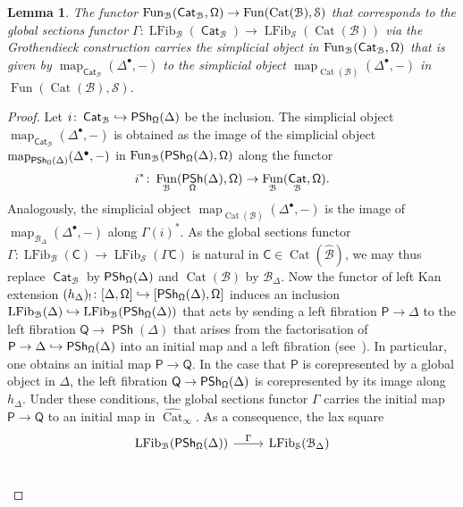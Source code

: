 \documentclass[reqno]{amsart}
\numberwithin{equation}{subsection}
\theoremstyle{plain}
\newtheorem{lemma}[equation]{Lemma}
\theoremstyle{definition}
\let\scr=\mathcal
\let\into=\hookrightarrow
\def\BB{\scr B}
\def\SS{\scr S}
\def\BBB{\widehat{\BB}}
\DeclareMathOperator{\IPSh}{\mathsf{PSh}}
\DeclareMathOperator{\Cat}{Cat}
\DeclareMathOperator{\ICat}{\mathsf{Cat}}
\DeclareMathOperator{\LFib}{LFib}
\DeclareMathOperator{\Fun}{Fun}
\DeclareMathOperator{\Map}{map}
\newcommand{\map}[1]{\Map_{#1}}
\newcommand{\I}[1]{\mathsf{#1}}
\newcommand{\iFun}[2]{{[#1,#2]}}
\newcommand{\Simp}[1]{#1_{\Delta}}
\newcommand{\CatSS}{\widehat{\Cat}_\infty}
\begin{document}
\begin{lemma}
	\label{lem:globalSectionsUniversalCosimplicialObject}
	The functor $\Fun_{\BB}(\ICat_{\BB},\Univ)\to\Fun(\Cat(\BB),\SS)$ that corresponds to the global sections functor $\Gamma\colon \LFib_{\BB}(\ICat_{\BB})\to\LFib_{\SS}(\Cat(\BB))$ via the Grothendieck construction carries the simplicial object in $\Fun_{\BB}(\ICat_{\BB},\Univ)$ that is given by $\map{\ICat_{\BB}}(\Delta^\bullet,-)$ to the simplicial object $\map{\Cat(\BB)}(\Delta^\bullet,-)$ in $\Fun(\Cat(\BB),\SS)$.
\end{lemma}
\begin{proof}
	Let $i\colon \ICat_{\BB}\into\IPSh_{\Univ}(\Delta)$ be the inclusion. The simplicial object $\map{\ICat_{\BB}}(\Delta^\bullet,-)$ is obtained as the image of the simplicial object $\map{\IPSh_{\Univ}(\Delta)}(\Delta^\bullet,-)$ in $\Fun_{\BB}(\IPSh_{\Univ}(\Delta),\Univ)$ along the functor
	\begin{equation*}
	i^\ast\colon \Fun_{\BB}(\IPSh_{\Univ}(\Delta),\Univ)\to\Fun_{\BB}(\ICat_{\BB},\Univ).
	\end{equation*}
	Analogously, the simplicial object $\map{\Cat(\BB)}(\Delta^\bullet,-)$ is the image of $\map{\Simp\BB}(\Delta^\bullet,-)$ along $\Gamma(i)^\ast$.
	As the global sections functor $\Gamma\colon \LFib_{\BB}(\I{C})\to\LFib_{\SS}(\Gamma\I{C})$ is natural in $\I{C}\in\Cat(\BBB)$, we may thus replace $\ICat_{\BB}$ by $\IPSh_{\Univ}(\Delta)$ and $\Cat(\BB)$ by $\Simp\BB$. Now the functor of left Kan extension $(h_{\Delta})_!\colon \iFun{\Delta}{\Univ}\into\iFun{\IPSh_{\Univ}(\Delta)}{\Univ}$ induces an inclusion $\LFib_{\BB}(\Delta)\into\LFib_{\BB}(\IPSh_{\Univ}(\Delta))$ that acts by sending a left fibration $\I{P}\to\Delta$ to the left fibration $\I{Q}\to\IPSh(\Delta)$ that arises from the factorisation of $\I{P}\to\Delta\into\IPSh_{\Univ}(\Delta)$ into an initial map and a left fibration (see~\cite[Corollary~3.3.3]{Martini2021a}). In particular, one obtains an initial map $\I{P}\to \I{Q}$. In the case that $\I{P}$ is corepresented by a global object in $\Delta$, the left fibration $\I{Q}\to\IPSh_{\Univ}(\Delta)$ is corepresented by its image along $h_{\Delta}$. Under these conditions, the global sections functor $\Gamma$ carries the initial map $\I{P}\to\I{Q}$ to an initial map in $\CatSS$. As a consequence, the lax square
	\begin{equation*}
	\begin{tikzcd}
	\LFib_{\BB}(\IPSh_{\Univ}(\Delta))\arrow[r, "\Gamma"] & \LFib_{\SS}(\Simp\BB)\\

\end{tikzcd}
\end{equation*}
\end{proof}
\end{document}
